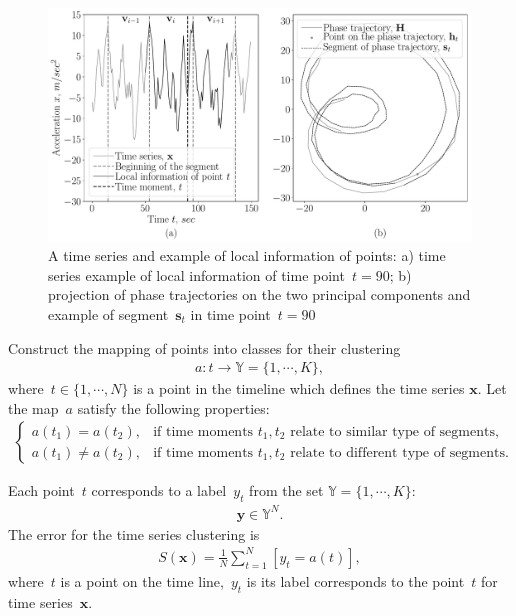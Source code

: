 \documentclass[12pt, twoside]{article}
\numberwithin{equation}{section}
\begin{document}
\begin{figure}[h!t]\center
\includegraphics[width=1\textwidth]{results_eng/statement}
\caption{A time series and example of local information of points:  a) time series example of local information of time point~$t = 90$; b) projection of phase trajectories on the two principal components and example of segment~$\textbf{s}_t$ in time point~$t = 90$}
\label{fig:statement:1}
\end{figure}

Construct the mapping of points into classes for their clustering
\begin{equation}
\label{eq:st:4}
\begin{aligned}
a : t \to \mathbb{Y} = \{1,\cdots, K\}, 
\end{aligned}
\end{equation}
where~$t \in \{1,\cdots, N\}$ is a point in the timeline which defines the time series $\textbf{x}$.
Let the map~$a$ satisfy the following properties:
\begin{equation}
\label{eq:st:5}
\begin{aligned}
\begin{cases}
    a\left(t_1\right) = a\left(t_2\right), &  \text{if time moments } t_1, t_2 \text{ relate to similar type of segments,}\\
    a\left(t_1\right) \not= a\left(t_2\right), &  \text{if time moments } t_1, t_2 \text{ relate to different type of segments.}
\end{cases}
\end{aligned}
\end{equation}

Each point~$t$ corresponds to a label~$y_t$ from the set $\mathbb{Y} =  \{1,\cdots,K\}$:
\begin{equation}
\label{eq:st:6}
\begin{aligned}
\textbf{y} \in \mathbb{Y}^{N}.
\end{aligned}
\end{equation}
The error for the time series clustering is
\begin{equation}
\label{eq:st:7}
\begin{aligned}
S\left(\textbf{x}\right) = \frac{1}{N}\sum_{t=1}^{N}[y_t = a\left(t\right)],
\end{aligned}
\end{equation}
where~$t$ is a point on the time line,~$y_t$ is its label corresponds to the point~$t$ for time series~$\textbf{x}$.
\end{document}

